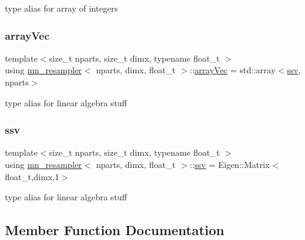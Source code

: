type alias for array of integers \mbox{\label{classmn__resampler_aa8ff37576399807b14a7a12615032bb1}} 
\subsubsection{\texorpdfstring{array\+Vec}{arrayVec}}
{\footnotesize\ttfamily template$<$size\+\_\+t nparts, size\+\_\+t dimx, typename float\+\_\+t $>$ \\
using \hyperlink{classmn__resampler}{mn\+\_\+resampler}$<$ nparts, dimx, float\+\_\+t $>$\+::\hyperlink{classrbase_aa12fc826befa6ba0647b5f59ebc396ee}{array\+Vec} =  std\+::array$<$\hyperlink{classrbase_ae20e0b8df15aa109252f57ecbf1f20f8}{ssv}, nparts$>$}

type alias for linear algebra stuff \mbox{\label{classmn__resampler_a1cb075b42f73e01de7fc1b27f51bfc4c}} 
\subsubsection{\texorpdfstring{ssv}{ssv}}
{\footnotesize\ttfamily template$<$size\+\_\+t nparts, size\+\_\+t dimx, typename float\+\_\+t $>$ \\
using \hyperlink{classmn__resampler}{mn\+\_\+resampler}$<$ nparts, dimx, float\+\_\+t $>$\+::\hyperlink{classrbase_ae20e0b8df15aa109252f57ecbf1f20f8}{ssv} =  Eigen\+::\+Matrix$<$float\+\_\+t,dimx,1$>$}

type alias for linear algebra stuff 

\subsection{Member Function Documentation}
\mbox{\label{classmn__resampler_a13b1897e180a791a3a099d5d6329a125}} 
